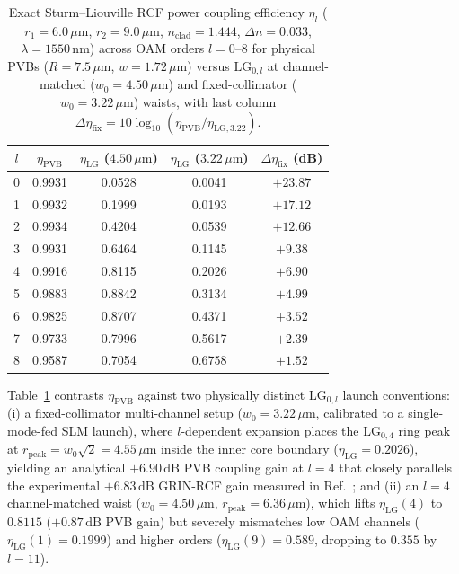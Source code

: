 \documentclass[aps,pra,onecolumn,notitlepage,11pt,tightenlines,nofootinbib,floatfix,longbibliography]{revtex4-2}
\begin{document}
\begin{table}[t]
\caption{Exact Sturm--Liouville RCF power coupling efficiency $\eta_l$ ($r_1 = 6.0\,\mu\mathrm{m}$, $r_2 = 9.0\,\mu\mathrm{m}$, $n_{\mathrm{clad}} = 1.444$, $\Delta n = 0.033$, $\lambda = 1550\,\mathrm{nm}$) across OAM orders $l = 0\text{--}8$ for physical PVBs ($R = 7.5\,\mu\mathrm{m}$, $w = 1.72\,\mu\mathrm{m}$) versus $\mathrm{LG}_{0,l}$ at channel-matched ($w_0 = 4.50\,\mu\mathrm{m}$) and fixed-collimator ($w_0 = 3.22\,\mu\mathrm{m}$) waists, with last column $\Delta\eta_{\mathrm{fix}} = 10\log_{10}(\eta_{\mathrm{PVB}}/\eta_{\mathrm{LG},3.22})$.}
\label{tab:rcf_coupling}
\begin{ruledtabular}
\setlength{\tabcolsep}{3.2pt}
\begin{tabular}{ccccc}
$l$ & $\eta_{\mathrm{PVB}}$ & $\eta_{\mathrm{LG}}$ ($4.50\,\mu\mathrm{m}$) & $\eta_{\mathrm{LG}}$ ($3.22\,\mu\mathrm{m}$) & $\Delta\eta_{\mathrm{fix}}$ (dB) \\
\hline
0 & 0.9931 & 0.0528 & 0.0041 & $+23.87$ \\
1 & 0.9932 & 0.1999 & 0.0193 & $+17.12$ \\
2 & 0.9934 & 0.4204 & 0.0539 & $+12.66$ \\
3 & 0.9931 & 0.6464 & 0.1145 & $+9.38$ \\
4 & 0.9916 & 0.8115 & 0.2026 & $+6.90$ \\
5 & 0.9883 & 0.8842 & 0.3134 & $+4.99$ \\
6 & 0.9825 & 0.8707 & 0.4371 & $+3.52$ \\
7 & 0.9733 & 0.7996 & 0.5617 & $+2.39$ \\
8 & 0.9587 & 0.7054 & 0.6758 & $+1.52$ \\
\end{tabular}
\end{ruledtabular}
\end{table}

Table~\ref{tab:rcf_coupling} contrasts $\eta_{\mathrm{PVB}}$ against two physically distinct $\mathrm{LG}_{0,l}$ launch conventions: (i) a fixed-collimator multi-channel setup ($w_0 = 3.22\,\mu\mathrm{m}$, calibrated to a single-mode-fed SLM launch), where $l$-dependent expansion places the $\mathrm{LG}_{0,4}$ ring peak at $r_{\mathrm{peak}} = w_0\sqrt{2} = 4.55\,\mu\mathrm{m}$ inside the inner core boundary ($\eta_{\mathrm{LG}} = 0.2026$), yielding an analytical $+6.90\,\mathrm{dB}$ PVB coupling gain at $l = 4$ that closely parallels the experimental $+6.83\,\mathrm{dB}$ GRIN-RCF gain measured in Ref.~\cite{Villalba2023}; and (ii) an $l = 4$ channel-matched waist ($w_0 = 4.50\,\mu\mathrm{m}$, $r_{\mathrm{peak}} = 6.36\,\mu\mathrm{m}$), which lifts $\eta_{\mathrm{LG}}(4)$ to $0.8115$ ($+0.87\,\mathrm{dB}$ PVB gain) but severely mismatches low OAM channels ($\eta_{\mathrm{LG}}(1) = 0.1999$) and higher orders ($\eta_{\mathrm{LG}}(9) = 0.589$, dropping to $0.355$ by $l = 11$).
\end{document}
